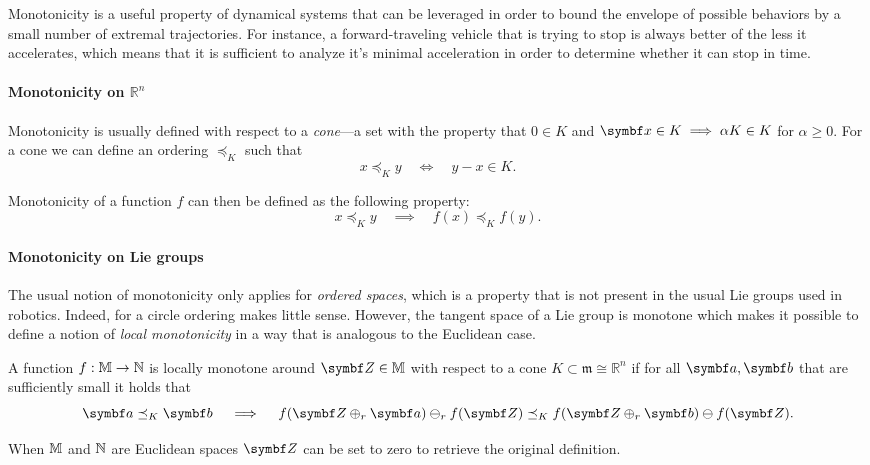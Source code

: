 Monotonicity is a useful property of dynamical systems that can be leveraged in order to bound the envelope of possible behaviors by a small number of extremal trajectories. For instance, a forward-traveling vehicle that is trying to stop is always better of the less it accelerates, which means that it is sufficient to analyze it's minimal acceleration in order to determine whether it can stop in time.

\paragraph{Monotonicity on $\mathbb{R}^n$} Monotonicity is usually defined with respect to a \emph{cone}---a set with the property that $0 \in K$ and $\x \in K \implies \alpha K \in K$ for $\alpha \geq 0$. For a cone we can define an ordering $\preceq_K$ such that
\begin{equation}
  x \preceq_K y \quad \Longleftrightarrow \quad y - x \in K.
\end{equation}

Monotonicity of a function $f$ can then be defined as the following property:
\begin{equation}
  x \preceq_K y  \quad \implies \quad f(x) \preceq_K f(y).
\end{equation}

\paragraph{Monotonicity on Lie groups}
The usual notion of monotonicity only applies for \emph{ordered spaces}, which is a property that is not present in the usual Lie groups used in robotics. Indeed, for a circle ordering makes little sense.  However, the tangent space of a Lie group is monotone which makes it possible to define a notion of \emph{local monotonicity} in a way that is analogous to the Euclidean case.

\begin{definition}
  \label{def:monotonicity}
  A function $f : \mathbb{M} \rightarrow \mathbb{N}$ is locally monotone around $\Z \in \M$ with respect to a cone $K \subset \mathfrak m \cong \mathbb{R}^n$ if for all $\a, \b$ that are sufficiently small it holds that
  \begin{equation}
    \a \preceq_K \b \quad \implies \quad f(\Z \oplus_r \a) \ominus_r f(\Z) \preceq_K f(\Z \oplus_r \b) \ominus f(\Z).
  \end{equation}
\end{definition}
When $\mathbb{M}$ and $\mathbb{N}$ are Euclidean spaces $\Z$ can be set to zero to retrieve the original definition.


